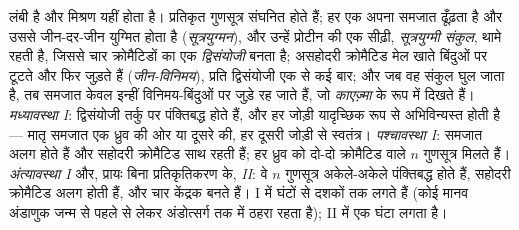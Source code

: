 \begin{proposition}[अवस्थाएँ]\label{prop:b2:meiosis-heredity:stages}
\emph{} लंबी है और मिश्रण यहीं होता है।
प्रतिकृत गुणसूत्र संघनित होते हैं; हर एक अपना समजात ढूँढ़ता है और उससे
जीन-दर-जीन युग्मित होता है (\emph{सूत्रयुग्मन}), और उन्हें प्रोटीन की
एक सीढ़ी, \emph{सूत्रयुग्मी संकुल}, थामे रहती है, जिससे चार क्रोमैटिडों
का एक \emph{द्विसंयोजी} बनता है; असहोदरी क्रोमैटिड मेल खाते बिंदुओं पर
टूटते और फिर जुड़ते हैं (\emph{जीन-विनिमय}), प्रति द्विसंयोजी एक से कई
बार; और जब वह संकुल घुल जाता है, तब समजात केवल इन्हीं विनिमय-बिंदुओं पर
जुड़े रह जाते हैं, जो \emph{काएज़्मा} के रूप में दिखते हैं।
\emph{मध्यावस्था I}: द्विसंयोजी तर्कु पर पंक्तिबद्ध होते हैं, और हर
जोड़ी यादृच्छिक रूप से अभिविन्यस्त होती है --- मातृ समजात एक ध्रुव की
ओर या दूसरे की, हर दूसरी जोड़ी से स्वतंत्र। \emph{पश्चावस्था I}:
समजात अलग होते हैं और सहोदरी क्रोमैटिड साथ रहती हैं; हर ध्रुव को दो-दो
क्रोमैटिड वाले $n$ गुणसूत्र मिलते हैं। \emph{अंत्यावस्था I}
और, प्रायः बिना प्रतिकृतिकरण के, \emph{ II}: वे $n$
गुणसूत्र अकेले-अकेले पंक्तिबद्ध होते हैं, सहोदरी क्रोमैटिड अलग होती
हैं, और चार  केंद्रक बनते हैं।  I में घंटों
से दशकों तक लगते हैं (कोई मानव अंडाणुक जन्म से पहले से लेकर अंडोत्सर्ग
तक  में ठहरा रहता है);
 II में एक घंटा लगता है।
\end{proposition}

